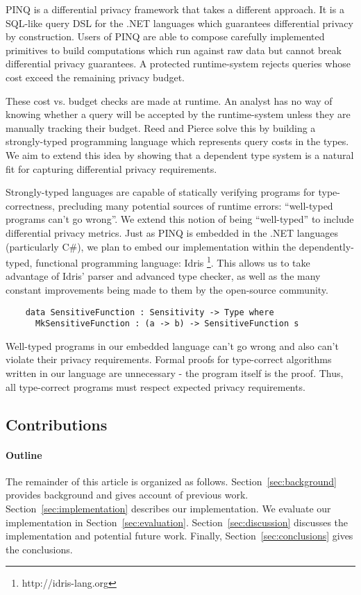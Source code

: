 \documentclass[12pt]{article}
\begin{document}
PINQ\cite{conf/sigmod/McSherry09} is a differential privacy framework that takes a different approach.
It is a SQL-like query DSL for the .NET languages which guarantees differential privacy by construction.
Users of PINQ are able to compose carefully implemented primitives to build computations which run against raw data but cannot break differential privacy guarantees.
A protected runtime-system rejects queries whose cost exceed the remaining privacy budget.

These cost vs. budget checks are made at runtime.
An analyst has no way of knowing whether a query will be accepted by the runtime-system unless they are manually tracking their budget.
Reed and Pierce\cite{conf/icfp/ReedP10} solve this by building a strongly-typed programming language which represents query costs in the types.
We aim to extend this idea by showing that a dependent type system is a natural fit for capturing differential privacy requirements.

Strongly-typed languages are capable of statically verifying programs for type-correctness, precluding many potential sources of runtime errors: ``well-typed programs can't go wrong''.
We extend this notion of being ``well-typed'' to include differential privacy metrics.
Just as PINQ is embedded in the .NET languages (particularly C\#), we plan to embed our implementation within the dependently-typed, functional programming language: Idris \footnote{http://idris-lang.org}.
This allows us to take advantage of Idris' parser and advanced type checker, as well as the many constant improvements being made to them by the open-source community.

\begin{lstlisting}
    data SensitiveFunction : Sensitivity -> Type where
      MkSensitiveFunction : (a -> b) -> SensitiveFunction s
\end{lstlisting}

Well-typed programs in our embedded language can't go wrong and also can't violate their privacy requirements.
Formal proofs for type-correct algorithms written in our language are unnecessary - the program itself is the proof.
Thus, all type-correct programs must respect expected privacy requirements.

\subsection{Contributions}

\paragraph{Outline}
The remainder of this article is organized as follows.
Section~\ref{sec:background} provides background and gives account of previous work.
Section~\ref{sec:implementation} describes our implementation.
We evaluate our implementation in Section~\ref{sec:evaluation}.
Section~\ref{sec:discussion} discusses the implementation and potential future work.
Finally, Section~\ref{sec:conclusions} gives the conclusions.
\end{document}

